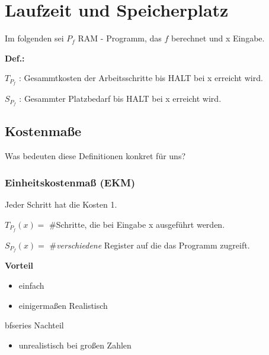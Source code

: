 \section{Laufzeit und Speicherplatz}

Im folgenden sei $P_f$ RAM - Programm, das $f$ berechnet und x Eingabe.

\begin{description}

\item{\bfseries Def.:}

\begin{description}

\item{$T_{P_f}$ : } Gesammtkosten der Arbeitsschritte bis HALT bei x erreicht wird.

\item{$S_{P_f}$ : } Gesammter Platzbedarf bis HALT bei x erreicht wird. 

\end{description}

\end{description}

\subsection{Kostenmaße}

Was bedeuten diese Definitionen konkret für uns?

\subsubsection{Einheitskostenmaß (EKM)}

Jeder Schritt hat die Kosten 1.

\begin{description}

\item{$T_{P_f}(x) = $ } \#Schritte, die bei Eingabe x ausgeführt werden.

\item{$S_{P_f}(x) = $ } \#\emph{verschiedene} Register auf die das Programm zugreift.

\item{\bfseries Vorteil}

\begin{itemize}[-]

\item einfach

\item einigermaßen Realistisch

\end{itemize}

\item{bfseries Nachteil}

\begin{itemize}[-]

\item unrealistisch bei großen Zahlen

\end{itemize}

\end{description}

